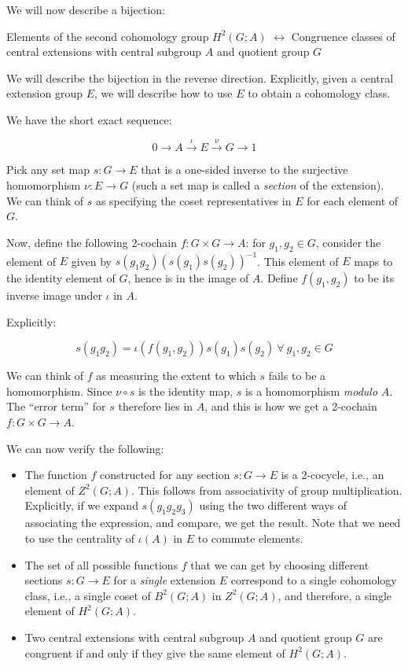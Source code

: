 \documentclass{ucetd}
\begin{document}
We will now describe a bijection:

Elements of the second cohomology group $H^2(G;A)$ $\leftrightarrow$
Congruence classes of central extensions with central subgroup $A$ and
quotient group $G$

We will describe the bijection in the reverse direction. Explicitly,
given a central extension group $E$, we will describe how to use $E$
to obtain a cohomology class.

We have the short exact sequence:

$$0 \to A \stackrel{\iota}{\to} E \stackrel{\nu}{\to} G \to 1$$

Pick any set map $s:G \to E$ that is a one-sided inverse to the
surjective homomorphism $\nu: E \to G$ (such a set map is called a
{\em section} of the extension). We can think of $s$ as specifying the
coset representatives in $E$ for each element of $G$.

Now, define the following 2-cochain $f: G \times G \to A$: for
$g_1,g_2 \in G$, consider the element of $E$ given by
$s(g_1g_2)(s(g_1)s(g_2))^{-1}$. This element of $E$ maps to the
identity element of $G$, hence is in the image of $A$. Define
$f(g_1,g_2)$ to be its inverse image under $\iota$ in $A$.

Explicitly:

$$s(g_1g_2) = \iota(f(g_1,g_2))s(g_1)s(g_2) \ \forall \ g_1,g_2 \in G$$

We can think of $f$ as measuring the extent to which $s$ fails to be a
homomorphism. Since $\nu \circ s$ is the identity map, $s$ is a
homomorphism {\em modulo} $A$. The ``error term'' for $s$ therefore
lies in $A$, and this is how we get a 2-cochain $f: G \times G \to A$.

We can now verify the following:

\begin{itemize}
\item The function $f$ constructed for any section $s:G \to E$ is a
  2-cocycle, i.e., an element of $Z^2(G;A)$. This follows from
  associativity of group multiplication. Explicitly, if we expand
  $s(g_1g_2g_3)$ using the two different ways of associating the
  expression, and compare, we get the result. Note that we need to use
  the centrality of $\iota(A)$ in $E$ to commute elements.
\item The set of all possible functions $f$ that we can get by
  choosing different sections $s :G \to E$ for a {\em single}
  extension $E$ correspond to a single cohomology class, i.e., a
  single coset of $B^2(G;A)$ in $Z^2(G;A)$, and therefore, a single
  element of $H^2(G;A)$.  
\item Two central extensions with central subgroup $A$ and quotient
  group $G$ are congruent if and only if they give the same element of
  $H^2(G;A)$.
\end{itemize}
\end{document}
